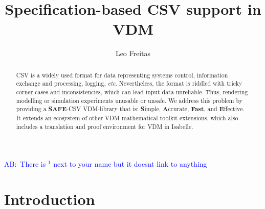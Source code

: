 \documentclass[runningheads,a4paper]{llncs}
\newcommand{\abcomment}[1]{{\scriptsize\textcolor{blue}{AB:~#1}}}  %
\begin{document}
%



\title{Specification-based CSV support in VDM}

\author{Leo Freitas
}
\authorrunning{ }

			
\maketitle
\setcounter{footnote}{0}
 \abcomment{There is $^{1}$ next to your name but it doesnt link to anything}
\begin{abstract}
CSV is a widely used format for data representing systems control, information exchange and processing, logging, \textit{etc}. Nevertheless, the format is riddled with tricky corner cases and inconsistencies, which can lead input data unreliable. Thus, rendering modelling or simulation experiments unusable or unsafe. We address this problem by providing a \textbf{SAFE}-CSV VDM-library that is: \textbf{S}imple, \textbf{A}ccurate, \textbf{Fast}, and \textbf{E}ffective. It extends an ecosystem of other VDM mathematical toolkit extensions, which also includes a translation and proof environment for VDM in Isabelle. 
\end{abstract}


\section{Introduction}\label{sec:intro}
\end{document}
